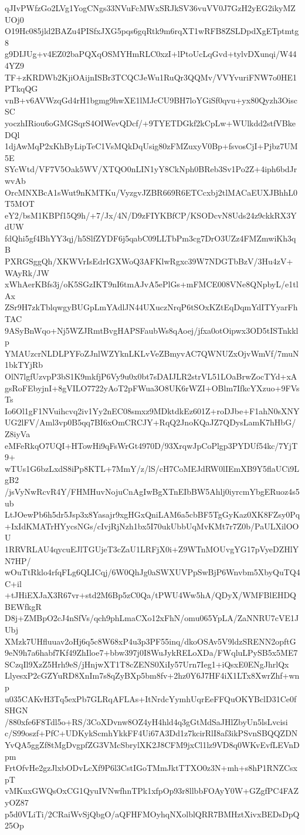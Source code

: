 qJIvPWfzGo2LVg1YogCNgs33NVuFcMWxSRJkSV36vuVV0J7GzH2yEG2ikyMZUOj0
O19Hc085jld2BAZu4PISfxJXG5pqs6gqRtk9m6rqXT1wRFB8ZSLDpdXgETptmtg8
g9DIJUg+v4EZ02baPQXqOSMYHmRLC0xzI+lPtoUcLqGvd+tylvDXunqi/W444YZ9
TF+zKRDWb2KjiOAijnISBr3TCQCJeWu1RuQr3QQMv/VVYvuriFNW7o0HE1PTkqQG
vnB+v6AVWzqGd4rH1bgmg9hwXE1lMJcCU9BH7loYGiSf0qvu+yx80Qyzh3OiscSC
yoczhIRiou6oGMGSqrS4OIWevQDcf/+9TYETDGkf2kCpLw+WUlkdd2stfVBkeDQl
1djAwMqP2xKhByLipTeC1VsMQkDqUsig80zFMZuxyV0Bp+fsvosCjI+Pjbz7UM5E
SYcWtd/VF7V5Oak5WV/XTQO0nLIN1yY8CkNph0BReb3Sv1Po2Z+4iph6bdJrwvAb
OrcMNXBcA1sWut9nKMTKu/VyzgvJZBR669R6ETCcxbj2tlMACaEUXJBhhL0T5MOT
eY2/bsM1KBPf15Q9h/+7/Jx/4N/D9zFIYKBfCP/KSODcvN8Uds24z9ckkRX3YdUW
fdQhi5gf4BhYY3qj/h5SlfZYDF6j5qabC09LLTbPm3cg7DrO3UZz4FMZmwiKh3qB
PXRGSggQh/XKWVrIsEdrIGXWoQ3AFKlwRgxc39W7NDGTbBzV/3Hu4zV+WAyRk/JW
xWhAerKBfs3j/oK5SGzIKT9nI6tmAJvA5ePlGs+mFMCE008VNe8QNpbyL/e1tlAx
ZSr9H7zkTblqwgyBUGpLmYAdlJN44UXuczNrqP6tSOxKZtEqDqmYdITYyarFhTAC
9ASyBnWqo+Nj5WZJRmtBvgHAPSFaubWs8qAoej/jfxa0otOipwx3OD5tISTnkklp
YMAUzcrNLDLPYFoZJnlWZYknLKLvVeZBmyvAC7QWNUZxOjvWmVf/7muN1bkTYjRb
OlN7lgfUzvpP3bS1K9mkfjP6Vy9u0x0bt7sDAIJLR2strVL51LOaBrwZocTYd+xA
gsRoFEbyjnI+8gVILO7722yAoT2pFWua3O8UK6rWZI+OBlm7IfkcYXzuo+9FVsTs
Io6Ol1gF1NVuihcvq2iv1Yy2nEC08smxz9MDktdkEz601Z+roDJbe+F1ahN0sXNY
UG2lFV/Aml3vp0B5qq7BI6xOmCRCJY+RqQ2JnoKQaJZ7QDysLamK7hHbG/Z8iyVa
eMFeRkqO7UQI+HTowHi9qFsWrGt4970D/93XrqwJpCoPlgp3PYDUf54kc/7YjT9+
wTUs1G6bzLxdS8iPp8KTL+7MmY/z/lS/cH7CoMEJdRW0lIEmXB9Y5flaUCi9LgB2
/jsVyNwRcvR4Y/FHMHuvNojuCnAgIwBgXTnEIbBW5Ahlj0iyrcmYbgERuoz4s5ub
LtJOewPb6h5dr5Jsp3x8Yasajr9xgHGxQniLAM6a5cbBF5TgGyKaz0XK8FZsy0Pq
+IxIdKMATrHYycsNGs/cIvjRjNzh1bx5I70ukUbbUqMvKMt7r7Z0b/PaULXilOOU
1RRVRLAU4qycuEJlTGUjeT3cZaU1LRFjX0i+Z9WTnMOUvgYG17pVyeDZHlYN7HP/
wOuTtRklo4rfqFLg6QLICqj/6W0QhJg0aSWXUVPpSwBjP6Wnvbm5XbyQuTQ4C+il
+tJHiEXJaX3R67vr+std2M6Bp5zC0Qa/tPWU4Ww5hA/QDyX/WMFBlEHDQBEWfkgR
D8j+ZMBpO2cJ4nSfVs/qch9phLmaCXo12xFhN/omu065YpLA/ZaNNRU7cVE1JUbj
XMzk7UHfluuav2oHj6q5c8W68xP4u3p3PF55inq/dkoOSAv5V9ldzSRENN2opftG
9eN9h7a6habf7Kf49ZhIloe7+bbw397j0I8WuJykRELoXDa/FWqluLPySB5x5ME7
SCzqIl9XzZ5Hrh9eS/jHnjwXT1T8cZENS0XiIy57Urn7Ieg1+iQsxE0ENgJhrlQx
LlyesxP2cGZYuRD8XnIm7s8qZyBXp5bm8fv+2hz0Y6J7HF4iX1LTx8XwrZhf+wnp
u035CAKvH3Tq5exPb7GLRqAFLAs+ItNrdcYymhUqrEeFFQuOKYBclD31Ce0fSHGN
/880xfe6F8Tdl5o+RS/3CoXDvnw8OZ4yH4hld4q3gGtMdSaJHlZbyUn5lsLvcisi
c/S99oszf+PfC+UDKykScmhYkkFF4Ui67A3Dd1z7kcirRlI8af3ikPSvnSBQQZDN
YvQA5ggZf8tMgDvgpfZG3VMcSbrylXK2J8CFM9jxCl1lz9VD8q0WKvEvfLEVnDpm
FrtOfvHe2gzJlxbODvLcXf9P6l3CstIGoTMmJktTTXO0z3N+mh+s8hP1RNZCsxpT
vMKuxGWQsOxCG1QyuIVNwfhnTPk1xfpOp93r8llbbFOAyY0W+GZgfPC4FAZyOZ87
p5d0VLiTi/2CRaiWvSjQbgO/aQFHFMOyhqNXolblQRR7BMHztXivxBEDsDpQ25Op
